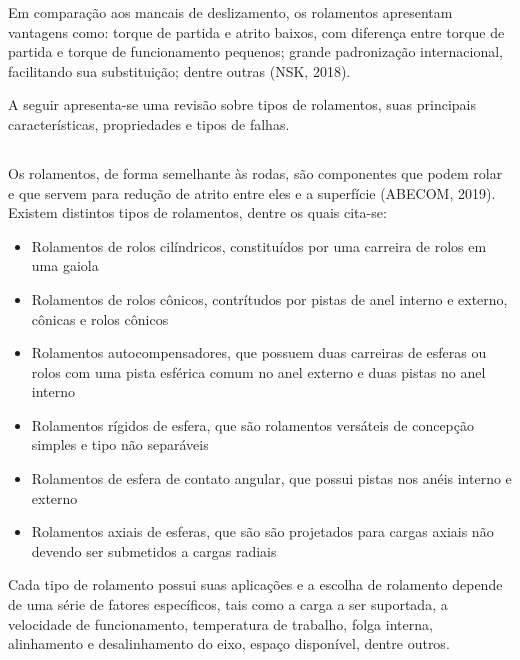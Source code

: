 \documentclass[
	12pt,				
	oneside,			
	a4paper,			
	english,			
	brazil,			
	]{abntex2ppgsi}
\begin{document}
Em comparação aos mancais de deslizamento, os rolamentos apresentam vantagens como: torque de partida e atrito baixos, com diferença entre torque de partida e torque de funcionamento pequenos; grande padronização internacional, facilitando sua substituição; dentre outras (NSK, 2018).

A seguir apresenta-se uma revisão sobre tipos de rolamentos, suas principais características, propriedades e tipos de falhas.

\subsection{}

Os rolamentos, de forma semelhante às rodas, são componentes que podem rolar  e que servem para redução de atrito entre eles e a superfície (ABECOM, 2019). Existem distintos tipos de rolamentos, dentre os quais cita-se:

\begin{itemize}
	\item Rolamentos de rolos cilíndricos, constituídos por uma carreira de rolos em uma gaiola
	\item Rolamentos de rolos cônicos, contrítudos por pistas de anel interno e externo, cônicas e rolos cônicos
	\item Rolamentos autocompensadores, que possuem duas carreiras de esferas ou rolos com uma pista esférica comum no anel externo e duas pistas no anel interno 	
	\item Rolamentos rígidos de esfera, que são rolamentos versáteis de concepção simples e tipo não separáveis
	\item Rolamentos de esfera de contato angular, que possui pistas nos anéis interno e externo
	\item Rolamentos axiais de esferas, que são são projetados para cargas axiais não devendo ser submetidos a cargas radiais
\end{itemize}

Cada tipo de rolamento possui suas aplicações e a escolha de rolamento depende de uma série de fatores específicos, tais como a carga a ser suportada, a velocidade de funcionamento, temperatura de trabalho, folga interna, alinhamento e desalinhamento do eixo, espaço disponível, dentre outros. 

\subsection{}
\end{document}
